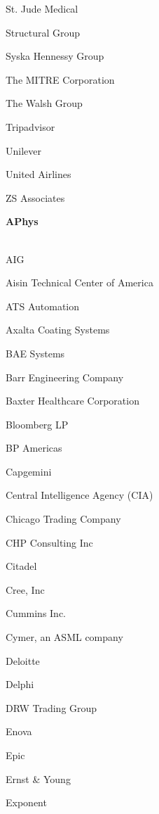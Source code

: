 \documentclass[twoside]{article}
\begin{document}
\begin{center}
\begin{multicols}{5}
\begin{FlushLeft}
\begin{compactitem}
\item St. Jude Medical
\item Structural Group
\item Syska Hennessy Group
\item The MITRE Corporation
\item The Walsh Group
\item Tripadvisor
\item Unilever
\item United Airlines
\item ZS Associates
\end{compactitem}
        \end{FlushLeft}
        \vspace{1em}
        {\fontsize{14}{16}\selectfont \bf APhys}\\
        \vspace{-1em}
        ~\hrulefill~
        \vspace{-.9em}
        \begin{FlushLeft}
        \begin{compactitem}
        \item AIG
\item Aisin Technical Center of America
\item ATS Automation
\item Axalta Coating Systems
\item BAE Systems
\item Barr Engineering Company
\item Baxter Healthcare Corporation
\item Bloomberg LP
\item BP Americas
\item Capgemini
\item Central Intelligence Agency (CIA)
\item Chicago Trading Company
\item CHP Consulting Inc
\item Citadel
\item Cree, Inc
\item Cummins Inc.
\item Cymer, an ASML company
\item Deloitte
\item Delphi
\item DRW Trading Group
\item Enova
\item Epic
\item Ernst \& Young
\item Exponent

\end{compactitem}
\end{FlushLeft}
\end{multicols}
\end{center}
\end{document}
